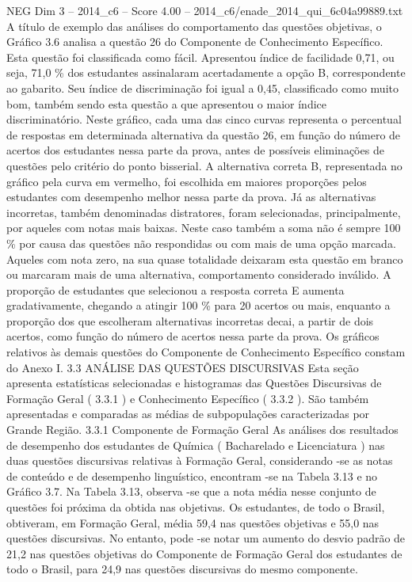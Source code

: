 \begin{textsample}{NEG Dim 3 – 2014\_c6 – Score 4.00 – 2014\_c6/enade\_2014\_qui\_6c04a99889.txt}
A título de exemplo das análises do comportamento das questões objetivas, o Gráfico 3.6 analisa a questão 26 do Componente de Conhecimento Específico.
Esta questão foi classificada como fácil.
Apresentou índice de facilidade 0,71, ou seja, 71,0 \% dos estudantes assinalaram acertadamente a opção B, correspondente ao gabarito.
Seu índice de discriminação foi igual a 0,45, classificado como muito bom, também sendo esta questão a que apresentou o maior índice discriminatório.
Neste gráfico, cada uma das cinco curvas representa o percentual de respostas em determinada alternativa da questão 26, em função do número de acertos dos estudantes nessa parte da prova, antes de possíveis eliminações de questões pelo critério do ponto bisserial.
A alternativa correta B, representada no gráfico pela curva em vermelho, foi escolhida em maiores proporções pelos estudantes com desempenho melhor nessa parte da prova.
Já as alternativas incorretas, também denominadas distratores, foram selecionadas, principalmente, por aqueles com notas mais baixas.
Neste caso também a soma não é sempre 100 \% por causa das questões não respondidas ou com mais de uma opção marcada.
Aqueles com nota zero, na sua quase totalidade deixaram esta questão em branco ou marcaram mais de uma alternativa, comportamento considerado inválido.
A proporção de estudantes que selecionou a resposta correta E aumenta gradativamente, chegando a atingir 100 \% para 20 acertos ou mais, enquanto a proporção dos que escolheram alternativas incorretas decai, a partir de dois acertos, como função do número de acertos nessa parte da prova.
Os gráficos relativos às demais questões do Componente de Conhecimento Específico constam do Anexo I. 3.3 ANÁLISE DAS QUESTÕES DISCURSIVAS Esta seção apresenta estatísticas selecionadas e histogramas das Questões Discursivas de Formação Geral ( 3.3.1 ) e Conhecimento Específico ( 3.3.2 ).
São também apresentadas e comparadas as médias de subpopulações caracterizadas por Grande Região. 3.3.1 Componente de Formação Geral As análises dos resultados de desempenho dos estudantes de Química ( Bacharelado e Licenciatura ) nas duas questões discursivas relativas à Formação Geral, considerando -se as notas de conteúdo e de desempenho linguístico, encontram -se na Tabela 3.13 e no Gráfico 3.7.
Na Tabela 3.13, observa -se que a nota média nesse conjunto de questões foi próxima da obtida nas objetivas.
Os estudantes, de todo o Brasil, obtiveram, em Formação Geral, média 59,4 nas questões objetivas e 55,0 nas questões discursivas.
No entanto, pode -se notar um aumento do desvio padrão de 21,2 nas questões objetivas do Componente de Formação Geral dos estudantes de todo o Brasil, para 24,9 nas questões discursivas do mesmo componente.

\end{textsample}
